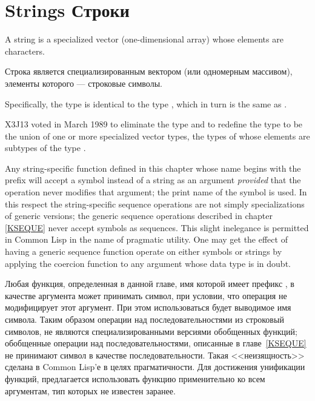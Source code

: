 

\chapter{Strings Строки}
\def\pagestatus{FINAL PROOF}

A string is a specialized vector (one-dimensional array)
whose elements are characters.

Строка является специализированным вектором (или одномерным массивом), элементы
которого --- строковые символы.

\begin{obsolete}
Specifically, the type 
is identical to the type , which in turn
is the same as .
\end{obsolete}

\begin{newer}
X3J13 voted in March 1989 
to eliminate the type  and to redefine the type
 to be the union of one or more specialized vector
types, the types of whose elements are subtypes of the type .
\end{newer}

Any string-specific function defined in this chapter
whose name begins with the prefix 
will accept a symbol instead of a string
as an argument \emph{provided} that the operation never modifies that argument;
the print name of the symbol is used.
In this respect the string-specific sequence operations are not
simply specializations of generic versions; the generic sequence
operations described in chapter \ref{KSEQUE} never accept symbols as sequences.
This slight inelegance is permitted in Common Lisp in the name of pragmatic utility.
One may get the effect of having a generic sequence function
operate on either symbols or strings by applying the coercion
function  to any argument whose data type is in doubt.

Любая функция, определенная в данной главе, имя которой имеет префикс
, в качестве аргумента может принимать символ, при
условии, что операция не модифицирует этот аргумент.
При этом использоваться будет выводимое имя символа.
Таким образом операции над последовательностями из строковый символов, не
являются специализированными версиями обобщенных функций; обобщенные операции
над последовательностями, описанные в главе~\ref{KSEQUE} не принимают символ в
качестве последовательности. Такая <<неизящность>> сделана в Common Lisp'е в
целях прагматичности. Для достижения унификации функций, предлагается использовать
функцию  применительно ко всем аргументам, тип которых не известен заранее.

